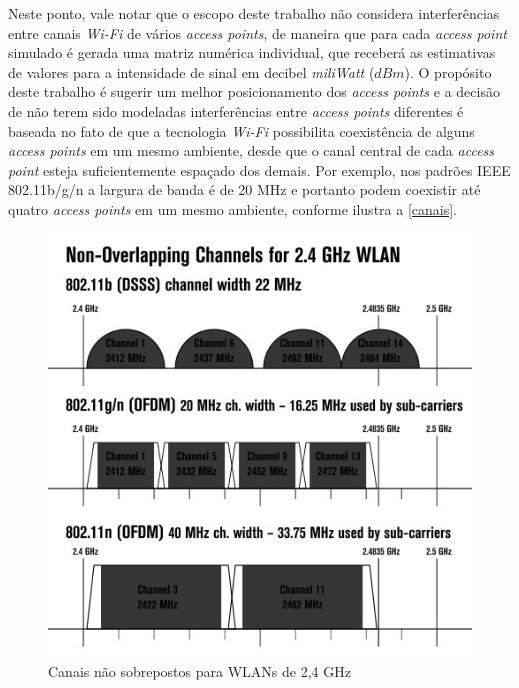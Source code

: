 \documentclass[
	12pt,				%
	twoside,			%
	a4paper,			%
	english,			%
	french,				%
	spanish,			%
	brazil				%
	]{abntex2}
\begin{document}
Neste ponto, vale notar que o escopo deste trabalho não considera
interferências entre canais \emph{Wi-Fi} de vários \emph{access points},
de maneira que para cada \emph{access point} simulado é gerada uma
matriz numérica individual, que receberá as estimativas de valores para
a intensidade de sinal em decibel \emph{miliWatt} (\(dBm\)). O propósito
deste trabalho é sugerir um melhor posicionamento dos \emph{access
points} e a decisão de não terem sido modeladas interferências entre
\emph{access points} diferentes é baseada no fato de que a tecnologia
\emph{Wi-Fi} possibilita coexistência de alguns \emph{access points} em
um mesmo ambiente, desde que o canal central de cada \emph{access point}
esteja suficientemente espaçado dos demais. Por exemplo, nos padrões
IEEE 802.11b/g/n a largura de banda é de 20 MHz e portanto podem
coexistir até quatro \emph{access points} em um mesmo ambiente, conforme
ilustra a \autoref{canais}.

\begin{figure}[htb]
    \caption{\label{canais} Canais não sobrepostos para WLANs de 2,4 GHz}
    \begin{center}
        \includegraphics[scale=0.6]{images/canais-1.jpg}
    \end{center}
\end{figure}
\end{document}
